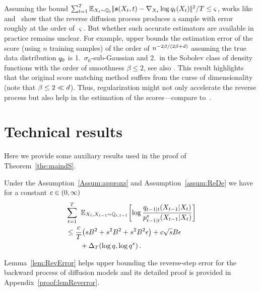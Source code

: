 Assuming the bound $\sum_{t=1}^T\textcolor{black}{\mathbb{E}}_{X_t\sim \mathbb{Q}_t}|\!|\textcolor{black}{\boldsymbol{s}}(X_t,t)-\nabla_{X_t}\log q_t(X_t)|\!|^2/T\le \varsigma$,
works like~\citet{li2023towards} and~\citet{liang2024nonN}
show that the reverse diffusion process produces a sample with error roughly at the order of $\varsigma$. But whether such accurate estimators are available in practice remains unclear.
For example,
\citet[Theorem 3.5, Corollary 3.7]{zhang2024minimax} upper bounds the estimation error of the score (using $n$ training samples) of the order of $n^{-2\beta/(2\beta+\textcolor{black}{d})}$ assuming the true data distribution $q_0$ is 1.~$\sigma_0$-sub-Gaussian and 2.~in the Sobolev class of density functions with the order of smoothness $\beta \le 2$, see also \citet{wibisono2024optimal,dou2024optimal}. 
This result highlights that the original score matching method suffers from the curse of dimensionality (note that $\beta \le 2\ll \textcolor{black}{d}$). 
Thus, regularization might not only  accelerate the reverse process but also help in the estimation of the scores---compare to~\citet{lederer2023extremes}. 



\section{Technical results}\label{sec:ThecRe}
Here we provide some auxiliary results  used in the proof of Theorem~\ref{the:maindS}. 

\begin{lemma}\label{lem:RevError}
Under the Assumption~\ref{Assum:approxs} and Assumption~\ref{assum:ReDe} we have for a constant $c\in (0,\infty)$ 
 \begin{align*}
    &\sum_{t=1}^{T}~\textcolor{black}{\mathbb{E}}_{X_t,X_{t-1}\sim \mathbb{Q}_{t,t-1}}\biggl[\log\frac{q_{t-1|t}(X_{t-1}|X_t)}{p^s_{t-1|t}(X_{t-1}|X_t)}\biggr]\notag\\
    &\le \frac{c}{T}\bigl(sB^2+  s^2B^2+ s^2B^2\epsilon\bigr)+c\sqrt{s}B \epsilon\notag\\
 &~~~~~~+\Delta_{T} (\log q,\log q^s)\,.
\end{align*}
 
\end{lemma}
Lemma~\ref{lem:RevError} helps upper bounding the reverse-step error for the backward process of diffusion models and 
its detailed proof is provided in Appendix~\ref{proof:lemReverror}. 

